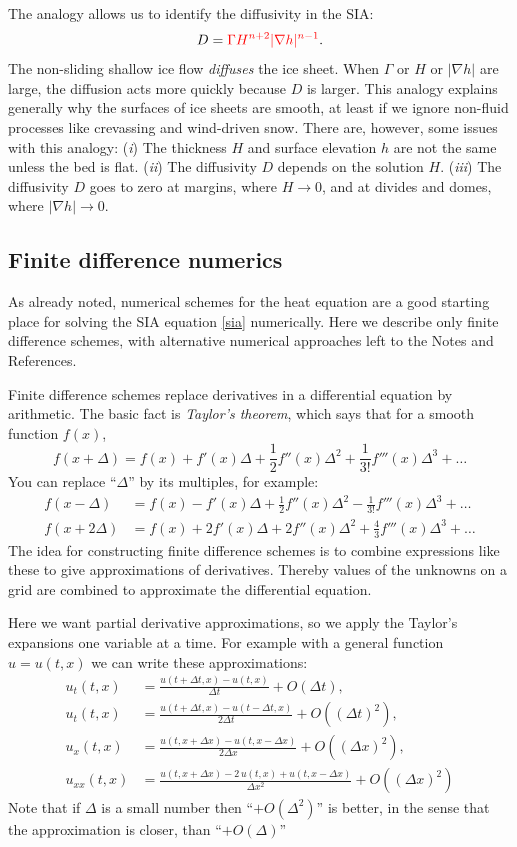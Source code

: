 \documentclass[titlepage,a4paper,final,12pt]{scrartcl}
\newcommand{\grad}{\nabla}
\begin{document}
The analogy allows us to identify the diffusivity in the SIA:
	$$D = {\color{red}\Gamma H^{n+2} |\grad h|^{n-1}}.$$
The non-sliding shallow ice flow \emph{diffuses} the ice sheet.  When $\Gamma$ or $H$ or $|\grad h|$ are large, the diffusion acts more quickly because $D$ is larger.  This analogy explains generally why the surfaces of ice sheets are smooth, at least if we ignore non-fluid processes like crevassing and wind-driven snow.  There are, however, some issues with this analogy:  (\emph{i})  The thickness $H$ and surface elevation $h$ are not the same unless the bed is flat.  (\emph{ii})  The diffusivity $D$ depends on the solution $H$.  (\emph{iii}) The diffusivity $D$ goes to zero at margins, where $H\to 0$, and at divides and domes, where $|\grad h|\to 0$.


\subsection{Finite difference numerics} 

As already noted, numerical schemes for the heat equation are a good starting place for solving the SIA equation \eqref{sia} numerically.  Here we describe only finite difference schemes, with alternative numerical approaches left to the Notes and References.

Finite difference schemes replace derivatives in a differential equation by arithmetic.  The basic fact is \emph{Taylor's theorem}, which says that for a smooth function $f(x)$,
	$$f(x+\Delta) = f(x) + f'(x) \Delta + \frac{1}{2} f''(x) \Delta^2 + \frac{1}{3!} f'''(x) \Delta^3 + \dots$$
You can replace ``$\Delta$'' by its multiples, for example:
\begin{align*}
f(x-\Delta) &= f(x) - f'(x) \Delta + \frac{1}{2} f''(x) \Delta^2 - \frac{1}{3!} f'''(x) \Delta^3 + \dots \\
f(x+2\Delta) &= f(x) + 2 f'(x) \Delta + 2 f''(x) \Delta^2 + \frac{4}{3} f'''(x) \Delta^3 + \dots
\end{align*}
The idea for constructing finite difference schemes is to combine expressions like these to give approximations of derivatives.  Thereby values of the unknowns on a grid are combined to approximate the differential equation.

Here we want partial derivative approximations, so we apply the Taylor's expansions one variable at a time.  For example with a general function $u=u(t,x)$ we can write these approximations:
\begin{align*}
u_t(t,x) &= \frac{u(t+\Delta t,x) - u(t,x)}{\Delta t} + O(\Delta t), \\
u_t(t,x) &= \frac{u(t+\Delta t,x) - u(t-\Delta t,x)}{2\Delta t} + O((\Delta t)^2), \\
u_x(t,x) &= \frac{u(t,x+\Delta x) - u(t,x-\Delta x)}{2\Delta x} + O((\Delta x)^2), \\
u_{xx}(t,x) &= \frac{u(t,x+\Delta x) - 2\, u(t,x) + u(t,x-\Delta x)}{\Delta x^2} + O((\Delta x)^2)
\end{align*}
Note that if $\Delta$ is a small number then ``$+O(\Delta^2)$'' is better, in the sense that the approximation is closer, than ``$+O(\Delta)$''
\end{document}
